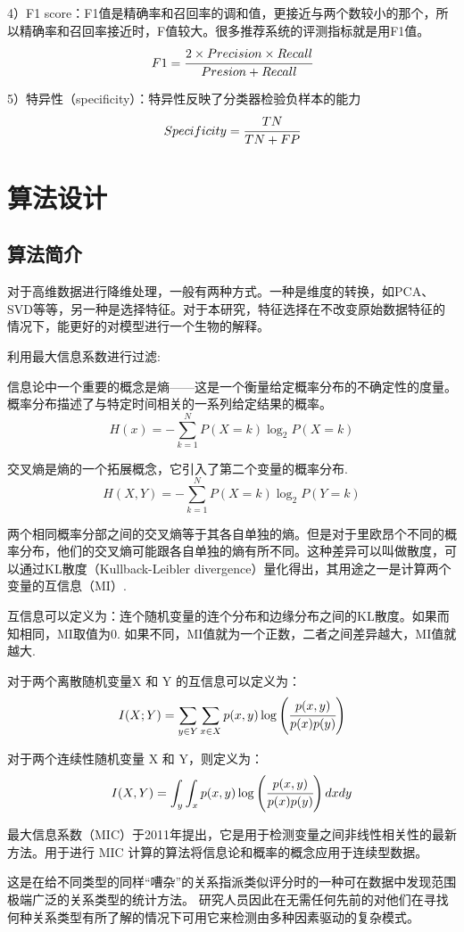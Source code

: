 \documentclass{njubachelor}
\begin{document}
4）F1 score：F1值是精确率和召回率的调和值，更接近与两个数较小的那个，所以精确率和召回率接近时，F值较大。很多推荐系统的评测指标就是用F1值。
$$F1 = \cfrac{2\times Precision \times Recall}{Presion + Recall}$$

5）特异性（specificity）：特异性反映了分类器检验负样本的能力
$$Specificity = \cfrac{TN}{TN+FP}$$

\section{算法设计}
\subsection{算法简介}
对于高维数据进行降维处理，一般有两种方式。一种是维度的转换，如PCA、SVD等等，另一种是选择特征。对于本研究，特征选择在不改变原始数据特征的情况下，能更好的对模型进行一个生物的解释。

利用最大信息系数进行过滤:

信息论中一个重要的概念是熵——这是一个衡量给定概率分布的不确定性的度量。概率分布描述了与特定时间相关的一系列给定结果的概率。
$$H(x) = -\sum^N_{k=1}P(X=k)\log_2P(X=k)$$

交叉熵是熵的一个拓展概念，它引入了第二个变量的概率分布.
$$H(X,Y)=-\sum_{k=1}^NP(X=k)\log_2P(Y=k)$$

两个相同概率分部之间的交叉熵等于其各自单独的熵。但是对于里欧昂个不同的概率分布，他们的交叉熵可能跟各自单独的熵有所不同。这种差异可以叫做散度，可以通过KL散度（Kullback-Leibler divergence）量化得出，其用途之一是计算两个变量的互信息（MI）. 

互信息可以定义为：连个随机变量的连个分布和边缘分布之间的KL散度。如果而知相同，MI取值为0.  如果不同，MI值就为一个正数，二者之间差异越大，MI值就越大. 

对于两个离散随机变量X 和 Y 的互信息可以定义为：
$$I(X;Y) = \sum_{y\in Y}\sum_{x\in X}p(x,y)\log\left(\cfrac{p(x,y)}{p(x)p(y)}\right)$$

对于两个连续性随机变量 X 和 Y，则定义为：
$$I(X,Y) = \int_y\int_xp(x,y)\log\left(\cfrac{p(x,y)}{p(x)p(y)} \right)dxdy$$

最大信息系数（MIC）于2011年提出，它是用于检测变量之间非线性相关性的最新方法。用于进行 MIC 计算的算法将信息论和概率的概念应用于连续型数据。

这是在给不同类型的同样“嘈杂”的关系指派类似评分时的一种可在数据中发现范围极端广泛的关系类型的统计方法。 研究人员因此在无需任何先前的对他们在寻找何种关系类型有所了解的情况下可用它来检测由多种因素驱动的复杂模式。 
\end{document}
